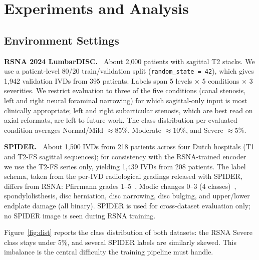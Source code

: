 \documentclass[runningheads]{llncs}
\begin{document}
\section{Experiments and Analysis}\label{sec4}

\subsection{Environment Settings}\label{exp1}

\textbf{RSNA 2024 LumbarDISC.}~\cite{kaggle2024} About 2{,}000 patients with sagittal T2 stacks. We use a patient-level 80/20 train/validation split (\verb|random_state = 42|), which gives 1{,}942 validation IVDs from 395 patients. Labels span 5 levels $\times$ 5 conditions $\times$ 3 severities. We restrict evaluation to three of the five conditions (canal stenosis, left and right neural foraminal narrowing) for which sagittal-only input is most clinically appropriate; left and right subarticular stenosis, which are best read on axial reformats, are left to future work. The class distribution per evaluated condition averages Normal/Mild $\approx 85\%$, Moderate $\approx 10\%$, and Severe $\approx 5\%$.

\textbf{SPIDER.}~\cite{vandergraaf2024spider} About 1{,}500 IVDs from 218 patients across four Dutch hospitals (T1 and T2-FS sagittal sequences); for consistency with the RSNA-trained encoder we use the T2-FS series only, yielding 1{,}439 IVDs from 208 patients. The label schema, taken from the per-IVD radiological gradings released with SPIDER, differs from RSNA: Pfirrmann grades 1--5~\cite{pfirrmann2001}, Modic changes 0--3 (4 classes)~\cite{modic1988}, spondylolisthesis, disc herniation, disc narrowing, disc bulging, and upper/lower endplate damage (all binary). SPIDER is used for cross-dataset evaluation only; no SPIDER image is seen during RSNA training.

Figure~\ref{fig:dist} reports the class distribution of both datasets: the RSNA Severe class stays under 5\%, and several SPIDER labels are similarly skewed. This imbalance is the central difficulty the training pipeline must handle.
\end{document}
